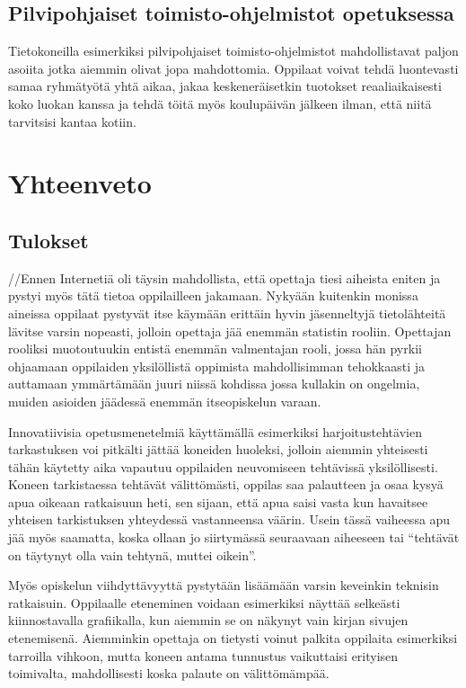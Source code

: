 \documentclass[utf8,bachelor]{gradu3}
\begin{document}
\section{Pilvipohjaiset toimisto-ohjelmistot opetuksessa}
Tietokoneilla esimerkiksi pilvipohjaiset toimisto-ohjelmistot mahdollistavat paljon asoiita jotka aiemmin olivat jopa mahdottomia. Oppilaat voivat tehdä luontevasti samaa ryhmätyötä yhtä aikaa, jakaa keskeneräisetkin tuotokset reaaliaikaisesti koko luokan kanssa ja tehdä töitä myös koulupäivän jälkeen ilman, että niitä tarvitsisi kantaa kotiin.

\chapter{Yhteenveto}

\section{Tulokset}
//Ennen Internetiä oli täysin mahdollista, että opettaja tiesi aiheista eniten ja pystyi myös tätä tietoa oppilailleen jakamaan. Nykyään kuitenkin monissa aineissa oppilaat pystyvät itse käymään erittäin hyvin jäsenneltyjä tietolähteitä lävitse varsin nopeasti, jolloin opettaja jää enemmän statistin rooliin. Opettajan rooliksi muotoutuukin entistä enemmän valmentajan rooli, jossa hän pyrkii ohjaamaan oppilaiden yksilöllistä oppimista mahdollisimman tehokkaasti ja auttamaan ymmärtämään juuri niissä kohdissa jossa kullakin on ongelmia, muiden asioiden jäädessä enemmän itseopiskelun varaan.

Innovatiivisia opetusmenetelmiä käyttämällä esimerkiksi harjoitustehtävien tarkastuksen voi pitkälti jättää koneiden huoleksi, jolloin aiemmin yhteisesti tähän käytetty aika vapautuu oppilaiden neuvomiseen tehtävissä yksilöllisesti. Koneen tarkistaessa tehtävät välittömästi, oppilas saa palautteen ja osaa kysyä apua oikeaan ratkaisuun heti, sen sijaan, että apua saisi vasta kun havaitsee yhteisen tarkistuksen yhteydessä vastanneensa väärin. Usein tässä vaiheessa apu jää myös saamatta, koska ollaan jo siirtymässä seuraavaan aiheeseen tai “tehtävät on täytynyt olla vain tehtynä, muttei oikein”.

Myös opiskelun viihdyttävyyttä pystytään lisäämään varsin keveinkin teknisin ratkaisuin. Oppilaalle eteneminen voidaan esimerkiksi näyttää selkeästi kiinnostavalla grafiikalla, kun aiemmin se on näkynyt vain kirjan sivujen etenemisenä. Aiemminkin opettaja on tietysti voinut palkita oppilaita esimerkiksi tarroilla vihkoon, mutta koneen antama tunnustus vaikuttaisi erityisen toimivalta, mahdollisesti koska palaute on välittömämpää.
\end{document}
